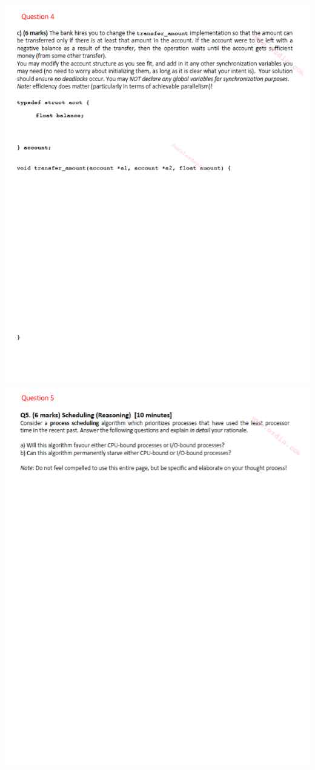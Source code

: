 \documentclass[12pt]{article}
\begin{document}
\begin{center}
    \includegraphics[width=\linewidth]{../../images/midterm_5_4.png}
    \includegraphics[width=\linewidth]{../../images/midterm_5_5.png}

\end{center}
\end{document}
